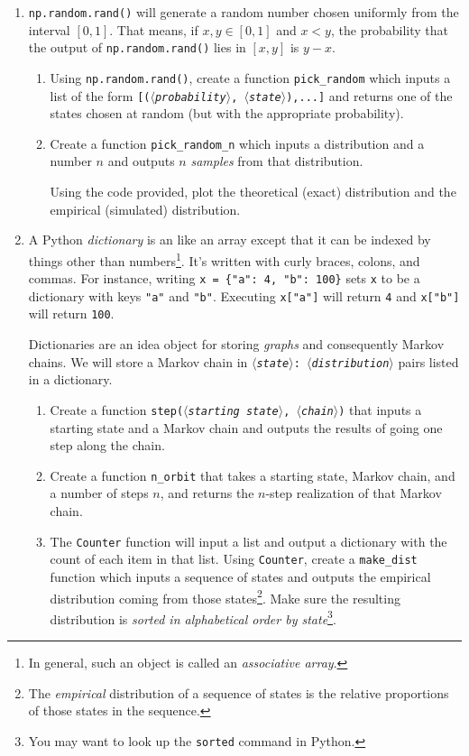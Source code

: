 \documentclass[letter]{article}
\newcommand{\var}[1]{{$\langle$\it #1$\rangle$}}
\begin{document}
	\begin{enumerate}
		\item {\tt np.random.rand()} will generate a random number chosen uniformly from the interval $[0,1]$. That
			means, if $x,y\in [0,1]$ and $x<y$, the probability that the output of {\tt np.random.rand()} lies in $[x,y]$
			is $y-x$.

		\begin{enumerate}
			\item 
			Using {\tt np.random.rand()}, create a function \verb|pick_random| which inputs a list of the form
			{\tt [(\var{probability}, \var{state}),...]} and returns one of the states chosen at random (but with 
			the appropriate probability).
			\item Create a function \verb|pick_random_n| which inputs a distribution and a number $n$ and outputs $n$
				\emph{samples} from that distribution.
				
				Using the code provided, plot the theoretical (exact) distribution and the empirical (simulated)
				distribution.
		\end{enumerate}

		\item A Python \emph{dictionary} is an like an array except that it can be indexed by things other than numbers\footnote{
		In general, such an object is called an \emph{associative array}.}. It's written with curly braces, colons, and commas.
		For instance, writing \verb|x = {"a": 4, "b": 100}| sets {\tt x} to be a dictionary with keys {\tt "a"} and {\tt "b"}.
		Executing \verb|x["a"]| will return {\tt 4} and \verb|x["b"]| will return {\tt 100}.

		Dictionaries are an idea object for storing \emph{graphs} and consequently Markov chains. We will store a Markov chain
		in {\tt \var{state}: \var{distribution}} pairs listed in a dictionary.
		\begin{enumerate}
			\item Create a function {\tt step(\var{starting state}, \var{chain})} that inputs a starting state and a Markov chain
				and outputs the results of going one step along the chain.
			\item Create a function \verb|n_orbit| that takes a starting state, Markov chain, and a number of steps $n$, and
				returns the $n$-step realization of that Markov chain.
			\item The {\tt Counter} function will input a list and output a dictionary with the count of each item in that list.
				Using {\tt Counter}, create a \verb|make_dist| function which inputs a sequence of states and outputs
				the empirical distribution coming from those states\footnote{ The \emph{empirical} distribution
				of a sequence of states is the relative proportions of those states in the sequence.}. Make sure
				the resulting distribution is \emph{sorted in alphabetical order by state}\footnote{ You may want to look
				up the {\tt sorted} command in Python.}.


\end{enumerate}
\end{enumerate}
\end{document}

